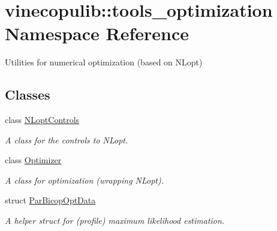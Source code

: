 \hypertarget{namespacevinecopulib_1_1tools__optimization}{\section{vinecopulib\+:\+:tools\+\_\+optimization Namespace Reference}
\label{namespacevinecopulib_1_1tools__optimization}
}


Utilities for numerical optimization (based on N\+Lopt)  


\subsection*{Classes}
\begin{DoxyCompactItemize}
\item 
class \hyperlink{classvinecopulib_1_1tools__optimization_1_1_n_lopt_controls}{N\+Lopt\+Controls}
\begin{DoxyCompactList}\small\item\em A class for the controls to N\+Lopt. \end{DoxyCompactList}\item 
class \hyperlink{classvinecopulib_1_1tools__optimization_1_1_optimizer}{Optimizer}
\begin{DoxyCompactList}\small\item\em A class for optimization (wrapping N\+Lopt). \end{DoxyCompactList}\item 
struct \hyperlink{structvinecopulib_1_1tools__optimization_1_1_par_bicop_opt_data}{Par\+Bicop\+Opt\+Data}
\begin{DoxyCompactList}\small\item\em A helper struct for (profile) maximum likelihood estimation. \end{DoxyCompactList}\end{DoxyCompactItemize}
